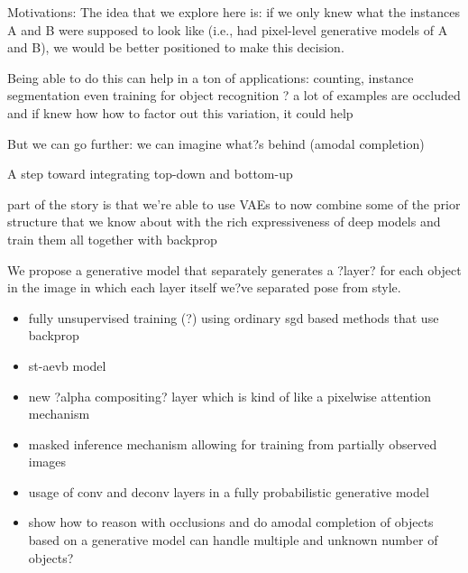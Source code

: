 Motivations:
	The idea that we explore here is: if we only knew what the instances A and B were supposed to look like (i.e., had pixel-level generative models of A and B), we would be better positioned to make this decision.

	Being able to do this can help in a ton of applications: counting, instance segmentation
		even training for object recognition ? a lot of examples are occluded and if knew how
			how to factor out this variation, it could help
			
	But we can go further: we can imagine what?s behind (amodal completion)

	A step toward integrating top-down and bottom-up
	
	part of the story is that we're able to use VAEs to now combine some of the prior structure that we know about 
		with the rich expressiveness of deep models and train them all together with backprop

We propose a generative model that separately generates a ?layer? for each object in the image
in which each layer itself we?ve separated pose from style.
\begin{itemize}
\item fully unsupervised training (?) using ordinary sgd based methods that use backprop
\item st-aevb model
\item new ?alpha compositing? layer which is kind of like a pixelwise attention mechanism
\item masked inference mechanism allowing for training from partially observed images
\item usage of conv and deconv layers in a fully probabilistic generative model
\item show how to reason with occlusions and do amodal completion of objects based on a generative model
can handle multiple and unknown number of objects?
\end{itemize}